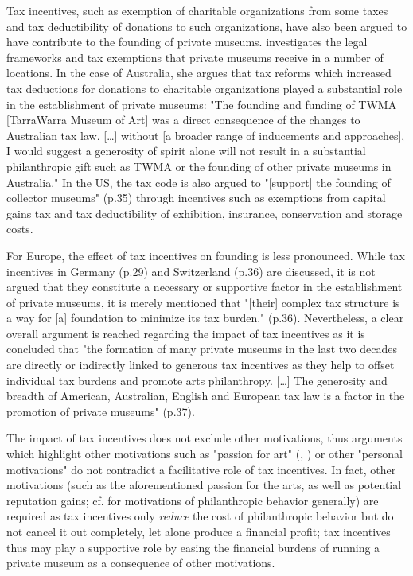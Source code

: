 \documentclass[11pt]{article}
\begin{document}
Tax incentives, such as exemption of charitable organizations from some taxes and tax deductibility of donations to such organizations, have also been argued to have contribute to the founding of private museums.
\textcite{Walker_2019_collector} investigates the legal frameworks and tax exemptions that private museums receive in a number of locations.
In the case of Australia, she argues that tax reforms which increased tax deductions for donations to charitable organizations played a substantial role in the establishment of private museums: "The founding and funding of TWMA [TarraWarra Museum of Art] was a direct consequence of the changes to Australian tax law. [\ldots{}] without [a broader range of inducements and approaches], I would suggest a generosity of spirit alone will not result in a substantial philanthropic gift such as TWMA or the founding of other private museums in Australia."
In the US, the tax code is also argued to "[support] the founding of collector museums" (p.35) through incentives such as exemptions from capital gains tax and tax deductibility of exhibition, insurance, conservation and storage costs.


For Europe, the effect of tax incentives on founding is less pronounced.
While tax incentives in Germany (p.29) and Switzerland (p.36) are discussed, it is not argued that they constitute a necessary or supportive factor in the establishment of private museums, it is merely mentioned that "[their] complex tax structure is a way for [a] foundation to minimize its tax burden." (p.36).
Nevertheless, a clear overall argument is reached regarding the impact of tax incentives as it is concluded that "the formation of many private museums in the last two decades are directly or indirectly linked to generous tax incentives as they help to offset individual tax burdens and promote arts philanthropy. [\ldots{}] The generosity and breadth of American, Australian, English and European tax law is a factor in the promotion of private museums" (p.37). 






The impact of tax incentives does not exclude other motivations, thus arguments which highlight other motivations such as "passion for art" (\cite[p.7]{Zorloni_Resch_2016_opportunities}, \cite[p.12]{Adam_2021_rise}) or other "personal motivations" \parencite[p.144]{Walker_2019_collector} do not contradict a facilitative role of tax incentives. 
In fact, other motivations (such as the aforementioned passion for the arts, as well as potential reputation gains; cf. \cite{Bekkers_Wiepking_2010_literature,Bekkers_Wiepking_2011_philanthropic} for motivations of philanthropic behavior generally) are required as tax incentives only \emph{reduce} the cost of philanthropic behavior but do not cancel it out completely, let alone produce a financial profit; tax incentives thus may play a supportive role by easing the financial burdens of running a private museum as a consequence of other motivations.
\end{document}
